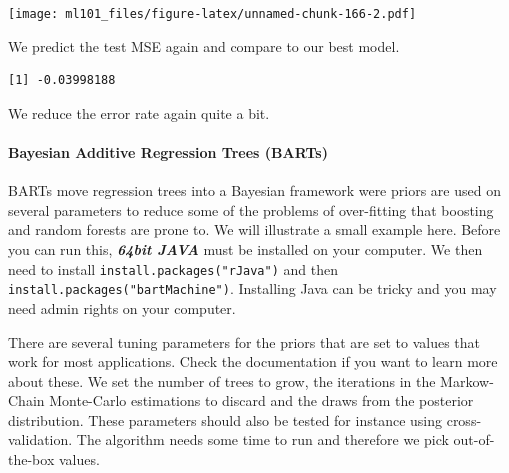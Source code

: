 \documentclass[]{article}
\newenvironment{Shaded}{\begin{snugshade}}{\end{snugshade}}
\newcommand{\CommentTok}[1]{\textcolor[rgb]{0.56,0.35,0.01}{\textit{#1}}}
\newcommand{\DataTypeTok}[1]{\textcolor[rgb]{0.13,0.29,0.53}{#1}}
\newcommand{\DecValTok}[1]{\textcolor[rgb]{0.00,0.00,0.81}{#1}}
\newcommand{\KeywordTok}[1]{\textcolor[rgb]{0.13,0.29,0.53}{\textbf{#1}}}
\newcommand{\NormalTok}[1]{#1}
\newcommand{\OperatorTok}[1]{\textcolor[rgb]{0.81,0.36,0.00}{\textbf{#1}}}
\newcommand{\StringTok}[1]{\textcolor[rgb]{0.31,0.60,0.02}{#1}}
\let\oldparagraph\paragraph
\renewcommand{\paragraph}[1]{\oldparagraph{#1}\mbox{}}
\begin{document}
\texttt{[image: ml101\_files/figure-latex/unnamed-chunk-166-2.pdf]}

We predict the test MSE again and compare to our best model.

\begin{Shaded}
\end{Shaded}

\begin{verbatim}
[1] -0.03998188
\end{verbatim}

We reduce the error rate again quite a bit.

\hypertarget{bayesian-additive-regression-trees-barts}{%
\paragraph{Bayesian Additive Regression Trees (BARTs)}\label{bayesian-additive-regression-trees-barts}}

BARTs move regression trees into a Bayesian framework were priors are used on several parameters to reduce some of the problems of over-fitting that boosting and random forests are prone to. We will illustrate a small example here. Before you can run this, \textbf{\emph{64bit JAVA}} must be installed on your computer. We then need to install \texttt{install.packages("rJava")} and then \texttt{install.packages("bartMachine")}. Installing Java can be tricky and you may need admin rights on your computer.

There are several tuning parameters for the priors that are set to values that work for most applications. Check the documentation if you want to learn more about these. We set the number of trees to grow, the iterations in the Markow-Chain Monte-Carlo estimations to discard and the draws from the posterior distribution. These parameters should also be tested for instance using cross-validation. The algorithm needs some time to run and therefore we pick out-of-the-box values.
\end{document}
